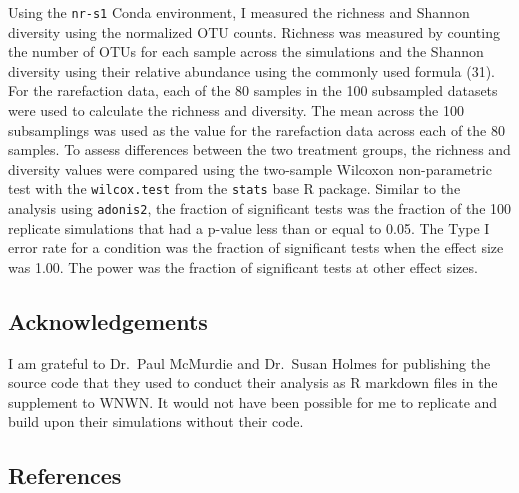\documentclass[
]{article}
\begin{document}
Using the \texttt{nr-s1} Conda environment, I measured the richness and
Shannon diversity using the normalized OTU counts. Richness was measured
by counting the number of OTUs for each sample across the simulations
and the Shannon diversity using their relative abundance using the
commonly used formula (31). For the rarefaction data, each of the 80
samples in the 100 subsampled datasets were used to calculate the
richness and diversity. The mean across the 100 subsamplings was used as
the value for the rarefaction data across each of the 80 samples. To
assess differences between the two treatment groups, the richness and
diversity values were compared using the two-sample Wilcoxon
non-parametric test with the \texttt{wilcox.test} from the
\texttt{stats} base R package. Similar to the analysis using
\texttt{adonis2}, the fraction of significant tests was the fraction of
the 100 replicate simulations that had a p-value less than or equal to
0.05. The Type I error rate for a condition was the fraction of
significant tests when the effect size was 1.00. The power was the
fraction of significant tests at other effect sizes.

\hypertarget{acknowledgements}{%
\subsection{Acknowledgements}\label{acknowledgements}}

I am grateful to Dr.~Paul McMurdie and Dr.~Susan Holmes for publishing
the source code that they used to conduct their analysis as R markdown
files in the supplement to WNWN. It would not have been possible for me
to replicate and build upon their simulations without their code.

\newpage

\hypertarget{references}{%
\subsection{References}\label{references}}

\setlength{\parindent}{-0.25in}
\setlength{\leftskip}{0.25in}

\noindent
\end{document}
